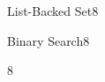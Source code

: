 \documentclass[a4paper]{article}
\begin{document}
\header

\begin{problem}{List-Backed Set}{8}
\end{problem}

\begin{problem}{Binary Search}{8}
\end{problem}

\begin{problem}{}{8}

\end{problem}
\end{document}
